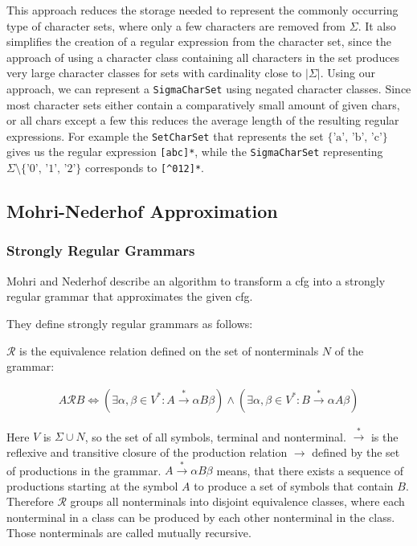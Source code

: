 This approach reduces the storage needed to represent the commonly occurring type of character sets, where only a few characters are removed from $\Sigma$. It also simplifies the creation of a regular expression from the character set, since the approach of using a character class containing all characters in the set produces very large character classes for sets with cardinality close to $|\Sigma|$. Using our approach, we can represent a \lstinline|SigmaCharSet| using negated character classes. Since most character sets either contain a comparatively small amount of given chars, or all chars except a few this reduces the average length of the resulting regular expressions. 
For example the \lstinline|SetCharSet| that represents the set $\{\text{'a', 'b', 'c'}\}$ gives us the regular expression \lstinline|[abc]*|, while the \lstinline|SigmaCharSet| representing $\Sigma \setminus \{\text{'0', '1', '2'}\}$ corresponds to \lstinline|[^012]*|.

		
\subsection{Mohri-Nederhof Approximation}

\subsubsection{Strongly Regular Grammars}
Mohri and Nederhof \cite{mohri_nederhof} describe an algorithm to transform a \ac{cfg} into a strongly regular grammar that approximates the given \ac{cfg}.

They define strongly regular grammars as follows:

$\mathcal{R}$ is the equivalence relation defined on the set of nonterminals $N$ of the grammar:

\begin{align}
	 A \mathcal{R} B \Leftrightarrow (\exists \alpha, \beta \in V^* : A \xrightarrow{*} \alpha B \beta) \land (\exists \alpha, \beta \in V^* : B \xrightarrow{*} \alpha A \beta) 
\end{align}

Here $V$ is $\Sigma \cup N$, so the set of all symbols, terminal and nonterminal. $\xrightarrow{*}$ is the reflexive and transitive closure of the production relation $\rightarrow$ defined by the set of productions in the grammar. $A \xrightarrow{*} \alpha B \beta$ means, that there exists a sequence of productions starting at the symbol $A$ to produce a set of symbols that contain $B$. Therefore $\mathcal{R}$ groups all nonterminals into disjoint equivalence classes, where each nonterminal in a class can be produced by each other nonterminal in the class. Those nonterminals are called mutually recursive.

